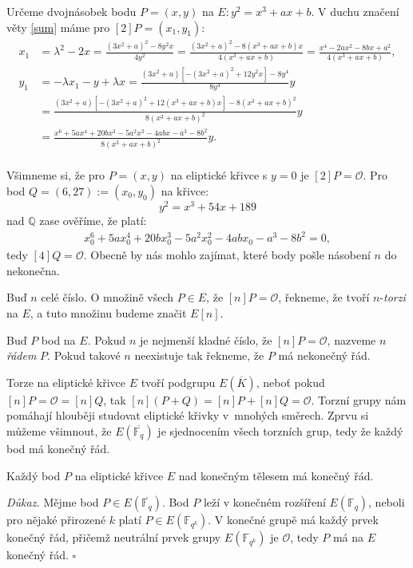 \documentclass[12pt]{report}
\begin{document}
\begin{priklad}\label{priklad2}
Určeme dvojnásobek bodu $P = (x,y)$ na $E : y^2 = x^3 + ax + b$. V duchu značení věty \ref{sum} máme pro $[2] P = (x_1,y_1)$:
\begin{align*}
x_1 &= \lambda^2 - 2x = \frac{(3x ^2 + a)^2 - 8 y^2 x }{4 y ^2} = \frac{(3x ^2 + a)^2 - 8 (x^3+ax+b) x }{4 (x^3+ax+b)} = \frac{x^4-2a x^2 - 8bx + a^2}{4 (x^3+ax+b)},\\
y_1 &=  - \lambda x_1 - y + \lambda x = \frac{(3x^2 + a)[-(3x ^2 + a)^2 + 12 y^2 x] - 8y^4}{8y^4} y \\
&=  \frac{(3x^2 + a)[-(3x ^2 + a)^2 + 12 (x^3 + ax + b) x] - 8 (x^3 + ax + b)^2}{8(x^3 + ax + b)^2} y\\
&= \frac{x^6 + 5 a x^4 + 20 b x^3 - 5 a^2 x^2 - 4ab x - a^3 - 8 b^2}{8(x^3 + ax + b)^2} y.  \\
\end{align*}
\end{priklad}


Všimneme si, že pro $P = (x,y)$ na eliptické křivce s $y=0$ je $[2] P = \mathcal{O}$. Pro bod $Q = (6,27) := (x_0,y_0)$ na křivce:
\begin{equation*}
y^2 = x^3 +54x+189
\end{equation*}
nad $\mathbb{Q}$ zase ověříme, že platí:
\begin{align*}
x_0^6 + 5 a x_0^4 + 20 b x_0^3 - 5 a^2 x_0^2 - 4ab x_0 - a^3 - 8 b^2 = 0,
\end{align*}
tedy $[4]Q = \mathcal{O}$. Obecně by nás mohlo zajímat, které body pošle násobení $n$ do nekonečna.


\begin{definice}
Buď $n$ celé číslo. O množině všech $P \in E$, že $[n] P = \mathcal{O}$, řekneme, že tvoří $n$-\textit{torzi} na $E$, a tuto množinu budeme značit $E[n]$.
\end{definice}

\begin{definice}
Buď $P$ bod na $E$. Pokud $n$ je nejmenší kladné číslo, že $[n]P = \mathcal{O}$, nazveme $n$ \textit{řádem} $P$. Pokud takové $n$ neexistuje tak řekneme, že $P$ má nekonečný řád.
\end{definice}

Torze na eliptické křivce $E$ tvoří podgrupu $E(\overline{K})$, neboť pokud $[n]P = \mathcal{O} = [n]Q$, tak $[n](P+Q) =[n]P+[n]Q=\mathcal{O}$. Torzní grupy nám pomáhají hlouběji studovat eliptické křivky v~mnohých směrech. Zprvu si můžeme všimnout, že $E(\overline{\mathbb{F}_q})$ je sjednocením všech torzních grup, tedy že každý bod má konečný řád.
\begin{veta}
Každý bod $P$ na eliptické křivce $E$ nad konečným tělesem má konečný řád.
\end{veta}
\noindent \textit{Důkaz. } Mějme bod $P \in E(\overline{\mathbb{F}_q})$. Bod $P$ leží v konečném rozšíření $E\left(\mathbb{F}_q\right)$, neboli pro nějaké přirozené $k$ platí $P \in E\left(\mathbb{F}_{q^k}\right)$. V konečné grupě má každý prvek konečný řád, přičemž neutrální prvek grupy $E\left(\mathbb{F}_{q^k}\right)$ je $\mathcal{O}$, tedy $P$ má na $E$ konečný řád. \hfill $\square$\\
\end{document}
